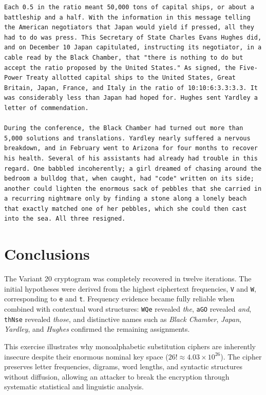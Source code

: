 \documentclass[11pt,a4paper]{article}
\begin{document}
\begin{lstlisting}[style=plaintext,caption={Recovered plaintext with restored word spacing}]
Each 0.5 in the ratio meant 50,000 tons of capital ships, or about a battleship and a half. With the information in this message telling the American negotiators that Japan would yield if pressed, all they had to do was press. This Secretary of State Charles Evans Hughes did, and on December 10 Japan capitulated, instructing its negotiator, in a cable read by the Black Chamber, that "there is nothing to do but accept the ratio proposed by the United States." As signed, the Five-Power Treaty allotted capital ships to the United States, Great Britain, Japan, France, and Italy in the ratio of 10:10:6:3.3:3.3. It was considerably less than Japan had hoped for. Hughes sent Yardley a letter of commendation.

During the conference, the Black Chamber had turned out more than 5,000 solutions and translations. Yardley nearly suffered a nervous breakdown, and in February went to Arizona for four months to recover his health. Several of his assistants had already had trouble in this regard. One babbled incoherently; a girl dreamed of chasing around the bedroom a bulldog that, when caught, had "code" written on its side; another could lighten the enormous sack of pebbles that she carried in a recurring nightmare only by finding a stone along a lonely beach that exactly matched one of her pebbles, which she could then cast into the sea. All three resigned.
\end{lstlisting}

\section{Conclusions}

The Variant 20 cryptogram was completely recovered in twelve iterations. The initial hypotheses were derived from the highest ciphertext frequencies, \texttt{V} and \texttt{W}, corresponding to \texttt{e} and \texttt{t}. Frequency evidence became fully reliable when combined with contextual word structures: \texttt{WQe} revealed \textit{the}, \texttt{aGO} revealed \textit{and}, \texttt{thNse} revealed \textit{those}, and distinctive names such as \textit{Black Chamber}, \textit{Japan}, \textit{Yardley}, and \textit{Hughes} confirmed the remaining assignments.

This exercise illustrates why monoalphabetic substitution ciphers are inherently insecure despite their enormous nominal key space ($26! \approx 4.03 \times 10^{26}$). The cipher preserves letter frequencies, digrams, word lengths, and syntactic structures without diffusion, allowing an attacker to break the encryption through systematic statistical and linguistic analysis.
\end{document}
